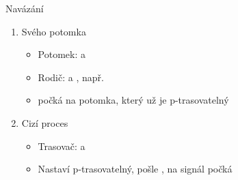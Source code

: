 \begin{frame}{}{Navázání}

  \begin{enumerate}
    \item Svého potomka
    \begin{itemize}
      \item Potomek:  a 

      \pause

      \item Rodič:  a ,
        např.\ 

      \pause

      \item {} počká na  potomka, který už je
	p-trasovatelný
    \end{itemize}

    \pause

    \item Cizí proces
    \begin{itemize}
      \item Trasovač:  a 

      \pause

      \item Nastaví  p-trasovatelný, pošle ,
	 na signál počká
    \end{itemize}
  \end{enumerate}

  \pause
  \medskip

   \\

\end{frame}

